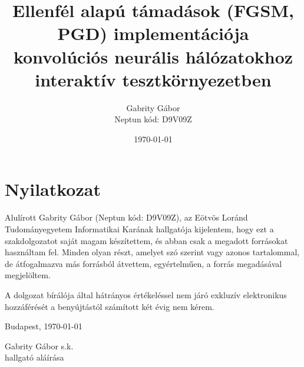 \documentclass[12pt,a4paper]{article}
\title{Ellenfél alapú támadások (FGSM, PGD) implementációja\\
konvolúciós neurális hálózatokhoz\\
interaktív tesztkörnyezetben}
\author{Gabrity Gábor\\Neptun kód: D9V09Z}
\date{\today}
\begin{document}
\onehalfspacing
\pagestyle{empty}

\maketitle
\newpage

\section*{Nyilatkozat}

Alulírott Gabrity Gábor (Neptun kód: D9V09Z), az Eötvös Loránd Tudományegyetem Informatikai Karának
hallgatója kijelentem, hogy ezt a szakdolgozatot saját magam készítettem, és abban csak a megadott
forrásokat használtam fel. Minden olyan részt, amelyet szó szerint vagy azonos tartalommal, de
átfogalmazva más forrásból átvettem, egyértelműen, a forrás megadásával megjelöltem.

A dolgozat bírálója által hátrányos értékeléssel nem járó exkluzív elektronikus hozzáférését a
benyújtástól számított két évig nem kérem.

\vspace{2cm}

Budapest, \today

\vspace{2cm}
\begin{flushright}
Gabrity Gábor s.k.\\
hallgató aláírása
\end{flushright}

\newpage
\end{document}
